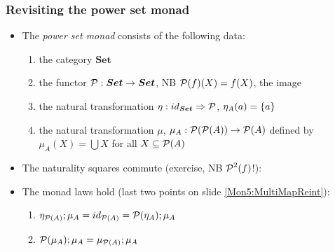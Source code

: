 \documentclass[handout]{beamer}
\newcommand{\To}{\Rightarrow}
\newcommand{\bfsf}[1]{{\boldsymbol{#1}}}
\newcommand{\Set}{\bfsf{Set}}
\begin{document}
\frame
  {   
    \frametitle{Revisiting the power set monad}\label{Mon5:PowSetMonad}

 \begin{itemize}[<+->]
\item The \emph{power set monad} consists of the following data:
 \begin{enumerate}
    \item the category $\Set$
    \item the functor $\powset:\Set\to\Set$, NB $\operatorname{\mathcal{P}}(f)(X) = f(X)$, the {\color{red}image}
    \item the natural transformation $\eta: id_\Set \To \powset$, $\eta_A(a)=\{a\}$
    \item the natural transformation $\mu$, 
$\mu_A: \operatorname{\mathcal{P}}(\operatorname{\mathcal{P}}(A)) \to \operatorname{\mathcal{P}}(A) $ defined by 
$\mu_A(X) = \bigcup X$ for all $X\subseteq\operatorname{\mathcal{P}}(A)$
 \end{enumerate}
\item The naturality squares commute (exercise, NB $\operatorname{\mathcal{P}}^2(f)$!):
\item The monad laws hold (last two points on slide \ref{Mon5:MultiMapReint}):
 \begin{enumerate}
    \item $\eta_{\operatorname{\mathcal{P}}(A)};\mu_A = id_{\operatorname{\mathcal{P}}(A)} = \operatorname{\mathcal{P}}(\eta_A);\mu_A$
    \item $\operatorname{\mathcal{P}}(\mu_A);\mu_A = \mu_{\operatorname{\mathcal{P}}(A)};\mu_A$
 \end{enumerate}
 \end{itemize}

 }
\end{document}
